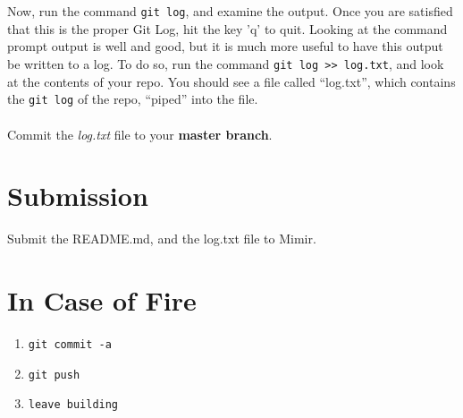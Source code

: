 \documentclass[12pt, letter]{article}
\begin{document}
    \\ \\
    Now, run the command \verb|git log|, and examine the output. Once you are satisfied that this is the proper Git Log, hit the key 'q' to quit. Looking at the command prompt output is well and good, but it is much more useful to have this output be written to a log. To do so, run the command \verb|git log >> log.txt|, and look at the contents of your repo. You should see a file called ``log.txt'', which contains the \verb|git log| of the repo, ``piped'' into the file. 
    \\ \\
    Commit the \emph{log.txt} file to your \textbf{master branch}.
    \section{Submission}
    Submit the README.md, and the log.txt file to Mimir.

    \section{In Case of Fire}
    \begin{enumerate}
        \item \texttt{git commit -a}

        \item \texttt{git push}

        \item \texttt{leave building}
    \end{enumerate}
\end{document}
